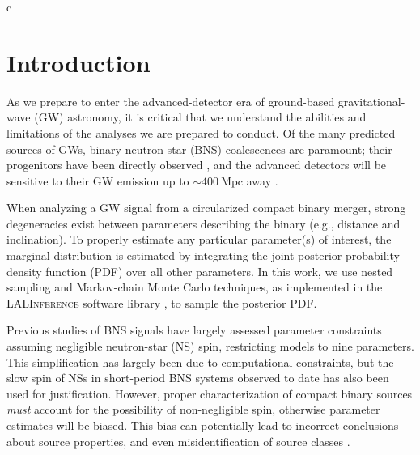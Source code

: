 c\section{Introduction}

As we prepare to enter the advanced-detector era of ground-based gravitational-wave (GW) astronomy, it is critical that we understand the abilities and limitations of the analyses we are prepared to conduct. Of the many predicted sources of GWs, binary neutron star (BNS) coalescences are paramount; their progenitors have been directly observed \cite{Lorimer_2008}, and the advanced detectors will be sensitive to their GW emission up to $\sim 400~\mathrm{Mpc}$ away \citep{2013arXiv1304.0670L}.

When analyzing a GW signal from a circularized compact binary merger, strong degeneracies exist between parameters describing the binary (e.g., distance and inclination). To properly estimate any particular parameter(s) of interest, the marginal distribution is estimated by integrating the joint posterior probability density function (PDF) over all other parameters. In this work, we use nested sampling \citep{Veitch_2010} and Markov-chain Monte Carlo \citep{Christensen_2003,R_ver_2006,van_der_Sluys_2008} techniques, as implemented in the \textsc{LALInference} software library \cite{Veitch_2014}, to sample the posterior PDF.

Previous studies of BNS signals have largely assessed parameter constraints assuming negligible neutron-star (NS) spin, restricting models to nine parameters. This simplification has largely been due to computational constraints, but the slow spin of NSs in short-period BNS systems observed to date \citep[e.g.,][]{Mandel_2010} has also been used for justification. However, proper characterization of compact binary sources \emph{must} account for the possibility of non-negligible spin, otherwise parameter estimates will be biased.  This bias can potentially lead to incorrect conclusions about source properties, and even misidentification of source classes \citep{Buonanno_2009,Berry_2014}.

